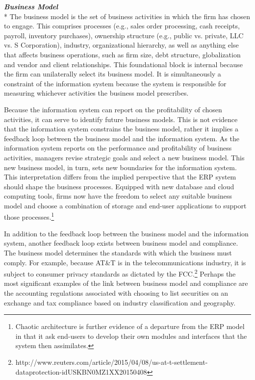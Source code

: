 \documentclass[12pt]{article}
\newcommand{\SubSubSection}[1]{{\centering{}\normalsize{}\textbf{\emph{#1}}}\\*\indent{}}
\begin{document}
\SubSubSection{Business Model}
The business model is the set of business activities in which the firm has chosen to engage. This comprises processes (e.g., sales order processing, cash receipts, payroll, inventory purchases), ownership structure (e.g., public vs. private, LLC vs. S Corporation), industry, organizational hierarchy, as well as anything else that affects business operations, such as firm size, debt structure, globalization and vendor and client relationships. This foundational block is internal because the firm can unilaterally select its business model. It is simultaneously a constraint of the information system because the system is responsible for measuring whichever activities the business model prescribes.

Because the information system can report on the profitability of chosen activities, it can serve to identify future business models. This is not evidence that the information system constrains the business model, rather it implies a feedback loop between the business model and the information system. As the information system reports on the performance and profitability of business activities, managers revise strategic goals and select a new business model. This new business model, in turn, sets new boundaries for the information system. This interpretation differs from the implied perspective that the ERP system should shape the business processes. Equipped with new database and cloud computing tools, firms now have the freedom to select any suitable business model and choose a combination of storage and end-user applications to support those processes.\footnote{Chaotic architecture is further evidence of a departure from the ERP model in that it ask end-users to develop their own modules and interfaces that the system then assimilates.}

In addition to the feedback loop between the business model and the information system, another feedback loop exists between business model and compliance. The business model determines the standards with which the business must comply. For example, because AT\&T is in the telecommunications industry, it is subject to consumer privacy standards as dictated by the FCC.\footnote{http://www.reuters.com/article/2015/04/08/us-at-t-settlement-dataprotection-idUSKBN0MZ1XX20150408} Perhaps the most significant examples of the link between business model and compliance are the accounting regulations associated with choosing to list securities on an exchange and tax compliance based on industry classification and geography.
\end{document}
